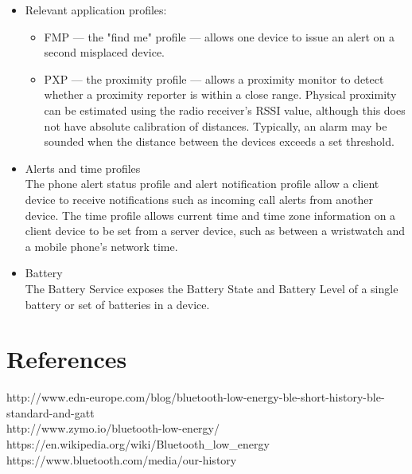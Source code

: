 \documentclass[11pt,a4paper]{article}
\begin{document}
{\begin{itemize}
\item Relevant application profiles:
\begin{itemize}
\item FMP — the "find me" profile — allows one device to issue an alert on a second misplaced device.
\item PXP — the proximity profile — allows a proximity monitor to detect whether a proximity reporter is within a close range. Physical proximity can be estimated using the radio receiver's RSSI value, although this does not have absolute calibration of distances. Typically, an alarm may be sounded when the distance between the devices exceeds a set threshold.
\end{itemize}
\item Alerts and time profiles\\
The phone alert status profile and alert notification profile allow a client device to receive notifications such as incoming call alerts from another device.
The time profile allows current time and time zone information on a client device to be set from a server device, such as between a wristwatch and a mobile phone's network time.
\item Battery\\
The Battery Service exposes the Battery State and Battery Level of a single battery or set of batteries in a device.
\end{itemize}
	}
    \newpage
	\section{ References}
	{
	http://www.edn-europe.com/blog/bluetooth-low-energy-ble-short-history-ble-standard-and-gatt\\
	http://www.zymo.io/bluetooth-low-energy/\\
	https://en.wikipedia.org/wiki/Bluetooth_low_energy\\
	https://www.bluetooth.com/media/our-history\\
	}

	
\end{document}
